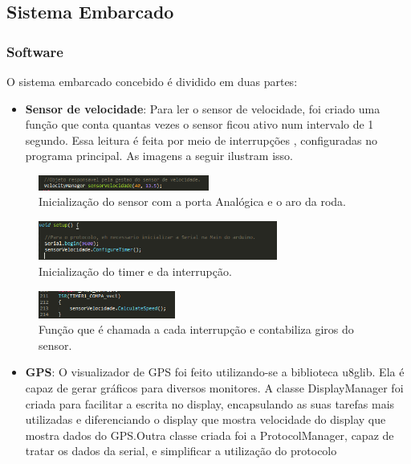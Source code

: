 		

	\subsection{Sistema Embarcado}
	\subsubsection{Software}
	O sistema embarcado concebido é dividido em duas partes:

	\begin{itemize}
		\item \textbf{Sensor de velocidade}: Para ler o sensor de velocidade, foi criado uma função que conta quantas vezes o sensor ficou ativo num intervalo de 1 segundo. Essa leitura é feita por meio de interrupções , configuradas no programa principal. As imagens a seguir ilustram isso.
	\end{itemize}

	\graphicspath{{figuras/}}
	\begin{figure}[H]
		\centering
		\includegraphics[width=0.5\textwidth]{embarcado1.png}
		\caption{Inicialização do sensor com a porta Analógica e o aro da roda.}
		\label{img:embarcado1}
	\end{figure}
	\graphicspath{{figuras/}}

	\begin{figure}[H]
		\centering
		\includegraphics[width=0.7\textwidth]{embarcado2.png}
		\caption{Inicialização do timer e da interrupção.}
		\label{img:embarcado2}
	\end{figure}

	\graphicspath{{figuras/}}
	\begin{figure}[H]
		\centering
		\includegraphics[width=0.4\textwidth]{embarcado3.png}
		\caption{Função que é chamada a cada interrupção e contabiliza giros do sensor.}
		\label{img:embarcado3}
	\end{figure}

	\begin{itemize}
		\item \textbf{GPS}:  O visualizador de GPS foi feito utilizando-se a biblioteca u8glib. Ela é capaz de gerar gráficos para diversos monitores. A classe DisplayManager foi criada para facilitar a escrita no display, encapsulando as suas tarefas mais utilizadas e diferenciando o display que mostra velocidade do display que mostra dados do GPS.Outra classe criada foi a ProtocolManager, capaz de tratar os dados da serial, e simplificar a utilização do protocolo	
	\end{itemize}

